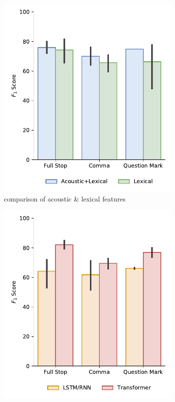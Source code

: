\documentclass[bsc,deptreport,ai]{infthesis} %
\begin{document}
\begin{figure}
\centering
\begin{subfigure}{.49\textwidth}
\centering
\includegraphics[width=.95\textwidth]{dataset_acoustic_lexical.pdf}
\caption{comparison of acoustic \& lexical features}%
\end{subfigure}
\begin{subfigure}{.49\textwidth}
\centering
\includegraphics[width=.95\textwidth]{dataset_transformer.pdf}

\end{subfigure}
\end{figure}
\end{document}
